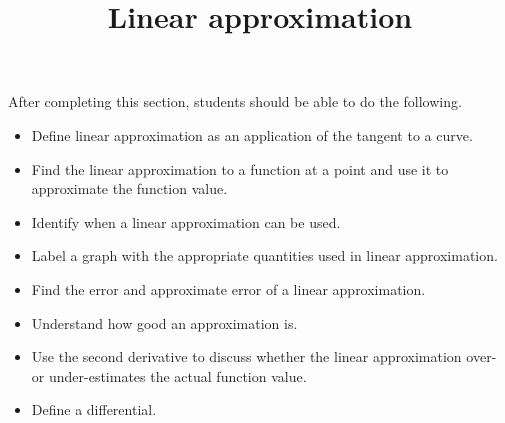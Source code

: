 \documentclass{ximera}
\title{Linear approximation}
\begin{document}
\begin{abstract}
\end{abstract}

\maketitle

\begin{sectionOutcomes}

After completing this section, students should be able to do the following.

\begin{itemize}
	\item Define linear approximation as an application of the tangent to a curve.
	\item Find the linear approximation to a function at a point and use it to approximate the function value.
	\item Identify when a linear approximation can be used.
	\item Label a graph with the appropriate quantities used in linear approximation.
	\item Find the error and approximate error of a linear approximation.
	\item Understand how good an approximation is.
	\item Use the second derivative to discuss whether the linear approximation over- or under-estimates the actual function value.
	\item Define a differential.
\end{itemize}

\end{sectionOutcomes}
\end{document}

